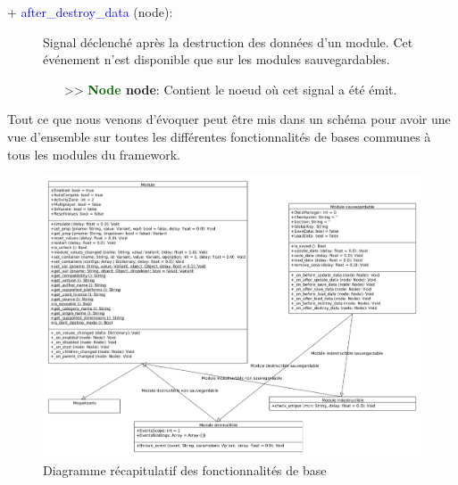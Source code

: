 \documentclass[a4paper, 11pt]{article}
\begin{document}
	\begin{description}
		\item [+ \textcolor{blue}{after\_destroy\_data} (node):] Signal déclenché après la destruction des 
		données d'un module. Cet événement n'est disponible que sur les modules sauvegardables.
		\begin{itemize}
			\item [>> \textbf{\textcolor{darkgreen}{Node} node}:] Contient le noeud où cet signal a été 
			émit.\\
		\end{itemize}
	\end{description}
	\newpage Tout ce que nous venons d'évoquer peut être mis dans un schéma pour avoir une vue d'ensemble 
	sur toutes les différentes fonctionnalités de bases communes à tous les modules du framework.
	\begin{figure}[h]
		\begin{center}\includegraphics[width = 550pt]{basic_diagram.png}\end{center}
		\caption{Diagramme récapitulatif des fonctionnalités de base}
		\label{Diagramme récapitulatif des fonctionnalités de base}
	\end{figure}

\end{document}
